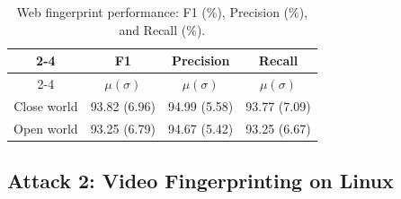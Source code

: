 











\begin{table}[]
\centering
\caption{Web fingerprint performance: F1 (\%), Precision (\%), and Recall (\%).}
\begin{tabular}{c|c|c|c|}
\cline{2-4}
                                  & \textbf{F1}     & \textbf{Precision} & \textbf{Recall} \\ \cline{2-4} 
                                  & \textbf{$ \mu (\sigma)$} &  \textbf{$ \mu (\sigma)$}    & \textbf{$ \mu (\sigma)$} \\ \hline \hline
\multicolumn{1}{|c|}{Close world} & 93.82 (6.96)    & 94.99 (5.58)       & 93.77 (7.09)    \\ \hline
\multicolumn{1}{|c|}{Open world}  & 93.25 (6.79)               & 94.67 (5.42)                   &   93.25 (6.67)              \\ \hline
\end{tabular}
\label{tb:web_results}
\end{table}


\subsection{Attack 2: Video Fingerprinting on Linux}
\label{subsec:video_finger}

